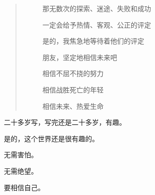 \begin{multicols}{\theparacolNo}
\begin{quote}
\begin{spacing}{0.5}
{{\begin{description}
								\item[\textcolor{Gray}{\faQuoteRight}] 那无数次的探索、迷途、失败和成功
								\item[\textcolor{Gray}{\faQuoteRight}] 一定会给予热情、客观、公正的评定
								\item[\textcolor{Gray}{\faQuoteRight}] 是的，我焦急地等待着他们的评定
								\item[\textcolor{Gray}{\faQuoteRight}] 朋友，坚定地相信未来吧
								\item[\textcolor{Gray}{\faQuoteRight}] 相信不屈不挠的努力
								\item[\textcolor{Gray}{\faQuoteRight}] 相信战胜死亡的年轻
								\item[\textcolor{Gray}{\faQuoteRight}] 相信未来、热爱生命
							\end{description}
						}}
			\end{spacing}
		\end{quote}

		二十多岁写，写完还是二十多岁，有趣。

		是的，这个世界还是很有趣的。

		无需害怕。

		无需绝望。

		要相信自己。
		\ifnum{}
	\end{multicols}
\fi
